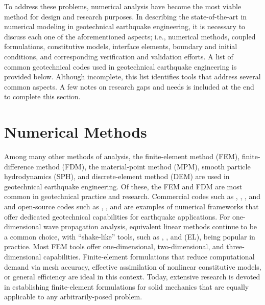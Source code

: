 To address these problems, numerical analysis have become the most viable method for design and research purposes. In describing the state-of-the-art in numerical modeling in geotechnical earthquake engineering, it is necessary to discuss each one of the aforementioned aspects; i.e., numerical methods, coupled formulations, constitutive models, interface elements, boundary and initial conditions, and corresponding verification and validation efforts. A list of common geotechnical codes used in geotechnical earthquake engineering is provided below. Although incomplete, this list identifies tools that address several common aspects. A few notes on research gaps and needs is included at the end to complete this section. 

\section{Numerical Methods}
\label{sec:resp_geotech_1}

Among many other methods of analysis, the finite-element method (FEM), finite-difference method (FDM), the material-point method (MPM), smooth particle hydrodynamics (SPH), and discrete-element method (DEM) are used in geotechnical earthquake engineering. Of these, the FEM and FDM are most common in geotechnical practice and research. Commercial codes such as , , , and  and open-source codes such as , , and  are examples of numerical frameworks that offer dedicated geotechnical capabilities for earthquake applications. For one-dimensional wave propagation analysis, equivalent linear methods continue to be a common choice, with ``shake-like'' tools, such as , , and  (EL), being popular in practice. Most FEM tools offer one-dimensional, two-dimensional, and three-dimensional capabilities. Finite-element formulations that reduce computational demand via mesh accuracy, effective assimilation of nonlinear constitutive models, or general efficiency \citep{McGann12, McGann15} are ideal in this context. Today, extensive research is devoted in establishing finite-element formulations for solid mechanics that are equally applicable to any arbitrarily-posed problem.


